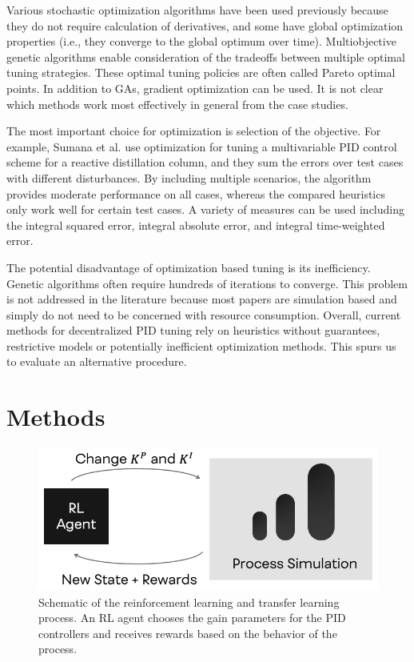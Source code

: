 Various stochastic optimization algorithms have been used previously because they do not require calculation of derivatives\citep{Sumana2010, Ganesh2010, Behroozsarand2012}, and some have global optimization properties (i.e., they converge to the global optimum over time). Multiobjective genetic algorithms enable consideration of the tradeoffs between multiple optimal tuning strategies.\citep{Behroozsarand2012, Pajares2019} These optimal tuning policies are often called Pareto optimal points. In addition to GAs, gradient optimization can be used.\citep{Sommer2011} It is not clear which methods work most effectively in general from the case studies.

The most important choice for optimization is selection of the objective. For example, Sumana et al. use optimization for tuning a multivariable PID control scheme for a reactive distillation column, and they sum the errors over  test cases with different disturbances.\citep{Sumana2010} By including multiple scenarios, the algorithm provides moderate performance on all cases, whereas the compared heuristics only work well for certain test cases. A variety of measures can be used including the integral squared error, integral absolute error, and integral time-weighted error. 

The potential disadvantage of optimization based tuning is its inefficiency. Genetic algorithms often require hundreds of iterations to converge. This problem is not addressed in the literature because most papers are simulation based and simply do not need to be concerned with resource consumption. Overall, current methods for decentralized PID tuning rely on heuristics without guarantees, restrictive models or potentially inefficient optimization methods.  This spurs us to evaluate an alternative procedure.

\section{Methods}
\begin{figure}
  \includegraphics[width=\linewidth]{gfx/Chapter05/rl_tuning_loop.png}
  \caption{Schematic of the reinforcement learning and transfer learning process. An RL agent chooses the gain parameters for the PID controllers and receives rewards based on the behavior of the process.}
  \label{immalabel}
\end{figure}

